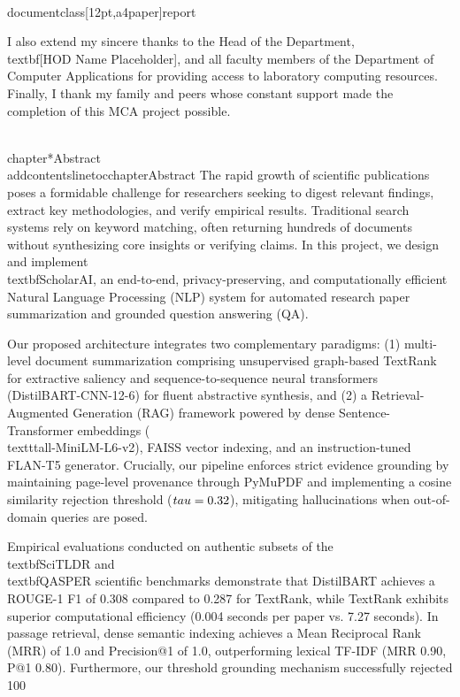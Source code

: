 \\documentclass[12pt,a4paper]{report}
\begin{document}
I also extend my sincere thanks to the Head of the Department, \\textbf{[HOD Name Placeholder]}, and all faculty members of the Department of Computer Applications for providing access to laboratory computing resources. Finally, I thank my family and peers whose constant support made the completion of this MCA project possible.

\\chapter*{Abstract}
\\addcontentsline{toc}{chapter}{Abstract}
The rapid growth of scientific publications poses a formidable challenge for researchers seeking to digest relevant findings, extract key methodologies, and verify empirical results. Traditional search systems rely on keyword matching, often returning hundreds of documents without synthesizing core insights or verifying claims. In this project, we design and implement \\textbf{ScholarAI}, an end-to-end, privacy-preserving, and computationally efficient Natural Language Processing (NLP) system for automated research paper summarization and grounded question answering (QA).

Our proposed architecture integrates two complementary paradigms: (1) multi-level document summarization comprising unsupervised graph-based TextRank for extractive saliency and sequence-to-sequence neural transformers (DistilBART-CNN-12-6) for fluent abstractive synthesis, and (2) a Retrieval-Augmented Generation (RAG) framework powered by dense Sentence-Transformer embeddings (\\texttt{all-MiniLM-L6-v2}), FAISS vector indexing, and an instruction-tuned FLAN-T5 generator. Crucially, our pipeline enforces strict evidence grounding by maintaining page-level provenance through PyMuPDF and implementing a cosine similarity rejection threshold ($\\tau = 0.32$), mitigating hallucinations when out-of-domain queries are posed.

Empirical evaluations conducted on authentic subsets of the \\textbf{SciTLDR} and \\textbf{QASPER} scientific benchmarks demonstrate that DistilBART achieves a ROUGE-1 F1 of 0.308 compared to 0.287 for TextRank, while TextRank exhibits superior computational efficiency (0.004 seconds per paper vs. 7.27 seconds). In passage retrieval, dense semantic indexing achieves a Mean Reciprocal Rank (MRR) of 1.0 and Precision@1 of 1.0, outperforming lexical TF-IDF (MRR 0.90, P@1 0.80). Furthermore, our threshold grounding mechanism successfully rejected 100\\%
\end{document}
